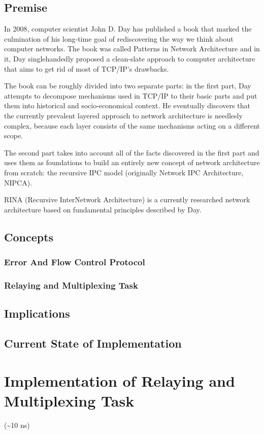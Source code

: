     \section{Premise}
        In 2008, computer scientist John D. Day has published a book that marked the culmination of his long-time goal of rediscovering the way we think about computer networks. The book was called Patterns in Network Architecture and in it, Day singlehandedly proposed a clean-slate approach to computer architecture that aims to get rid of most of TCP/IP's drawbacks.

        The book can be roughly divided into two separate parts: in the first part, Day attempts to decompose mechanisms used in TCP/IP to their basic parts and put them into historical and socio-economical context. He eventually discovers that the currently prevalent layered approach to network architecture is needlesly complex, because each layer consists of the same mechanisms acting on a different scope.

        The second part takes into account all of the facts discovered in the first part and uses them as foundations to build an entirely new concept of network architecture from scratch: the recursive IPC model (originally Network IPC Architecture, NIPCA).

        RINA (Recursive InterNetwork Architecture) is a currently researched network architecture based on fundamental principles described by Day.

    \section{Concepts}
        \subsection{Error And Flow Control Protocol}
        \subsection{Relaying and Multiplexing Task}
    \section{Implications}
    \section{Current State of Implementation}

\chapter{Implementation of Relaying and Multiplexing Task}
    (\textasciitilde10 ns)
